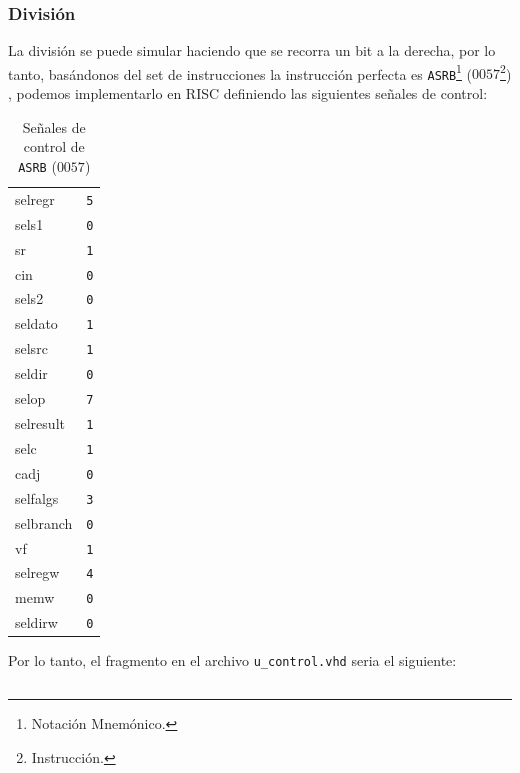 \documentclass{IEEEtran}
\newenvironment{code}{\captionsetup{type=listing}}{}
\begin{document}
\subsubsection{División}
\label{sec:org350904d}
La división se puede simular haciendo que se recorra un bit a la derecha, por lo tanto, basándonos del set de instrucciones la instrucción perfecta es \texttt{ASRB}\footnote{Notación Mnemónico.} (\(0057\)\footnote{Instrucción.}) \cite[p. 24]{PM1999}, podemos implementarlo en RISC definiendo las siguientes señales de control:
\begin{table}[htbp]
\caption{Señales de control de \texttt{ASRB} (\(0057\))}
\centering
\begin{tabular}{ll}
\hline
selregr & \texttt{5}\\
sels1 & \texttt{0}\\
sr & \texttt{1}\\
cin & \texttt{0}\\
sels2 & \texttt{0}\\
seldato & \texttt{1}\\
selsrc & \texttt{1}\\
seldir & \texttt{0}\\
selop & \texttt{7}\\
selresult & \texttt{1}\\
selc & \texttt{1}\\
cadj & \texttt{0}\\
selfalgs & \texttt{3}\\
selbranch & \texttt{0}\\
vf & \texttt{1}\\
selregw & \texttt{4}\\
memw & \texttt{0}\\
seldirw & \texttt{0}\\
\hline
\end{tabular}
\end{table}
Por lo tanto, el fragmento en el archivo \texttt{u\_control.vhd} seria el siguiente:
\begin{code}
\caption{\texttt{ASRB} en \texttt{u\_control.vhd}}
\inputminted[firstline=413, lastline=431]{vhdl}{../Risc/u_control.vhd}
\end{code}
\end{document}
